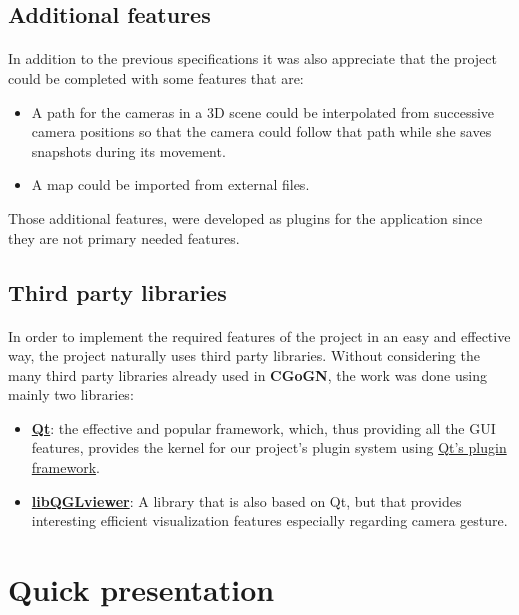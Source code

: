 \documentclass[a4paper]{scrreprt}
\begin{document}
\subsection{Additional features}
	\paragraph{}
	In addition to the previous specifications it was also appreciate that the
	project could be completed with some features that are:
	\begin{itemize}
	  \item A path for the cameras in a 3D scene could be interpolated from
	  successive camera positions so that the camera could follow that path while
	  she saves snapshots during its movement.
	  \item A map could be imported from external files.
	\end{itemize}
	Those additional features, were developed as plugins for the application
	since they are not primary needed features.

\subsection{Third party libraries}
	\paragraph{}
	In order to implement the required features of the project in an easy and
	effective way, the project naturally uses third party libraries. Without
	considering the many third party libraries already used in \textbf{CGoGN}, the
	work was done using mainly two libraries:
	\begin{itemize}
	  \item \textbf{\href{http://qt-project.org/}{Qt}}: the effective and popular
	  framework, which, thus providing all the GUI features, provides the kernel
	  for our project's plugin system using
	  \href{http://qt-project.org/doc/qt-4.8/plugins-howto.html#the-lower-level-api-extending-qt-applications}{Qt's
	  plugin framework}.
	  \item \textbf{\href{http://www.libqglviewer.com/}{libQGLviewer}}: A library
	  that is also based on Qt, but that provides interesting efficient visualization
	  features especially regarding camera gesture.
	\end{itemize}
	
\section{Quick presentation}
\end{document}
